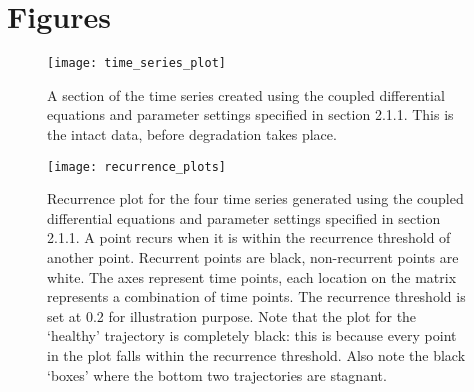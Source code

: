 \documentclass[utf8]{FrontiersinVancouver}
\begin{document}

\newpage

\newpage
\section*{Figures}
\begin{figure}[H]
    \begin{center}
    \texttt{[image: time\_series\_plot]}
    \end{center}
    \caption{A section of the time series created using the coupled differential equations and parameter settings specified in section 2.1.1. This is the intact data, before degradation takes place.}\label{fig:1}
    \end{figure}

\newpage
\begin{figure}[H]
    \begin{center}
    \texttt{[image: recurrence\_plots]}
    \end{center}
    \caption{Recurrence plot for the four time series generated using the coupled differential equations and parameter settings specified in section 2.1.1. A point recurs when it is within the recurrence threshold of another point. Recurrent points are black, non-recurrent points are white. The axes represent time points, each location on the matrix represents a combination of time points. The recurrence threshold is set at 0.2 for illustration purpose. Note that the plot for the `healthy' trajectory is completely black: this is because every point in the plot falls within the recurrence threshold. Also note the black `boxes' where the bottom two trajectories are stagnant.}\label{fig:2}
    \end{figure}
\end{document}

